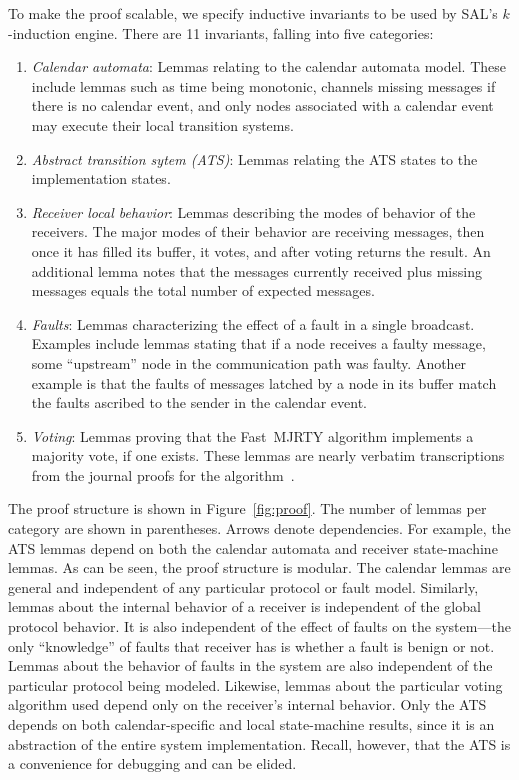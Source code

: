 \documentclass{llncs/llncs}
\begin{document}
{To make the proof scalable, we specify inductive invariants to be used by SAL's $k$-induction engine. There are 11 invariants, falling into five categories:
\begin{enumerate}
  \item \emph{Calendar automata}: Lemmas relating to the calendar automata model. These include lemmas such as time being monotonic, channels missing messages if there is no calendar event, and only nodes associated with a calendar event may execute their local transition systems.
  \item \emph{Abstract transition sytem (ATS)}: Lemmas relating the ATS states to the implementation states.
  \item \emph{Receiver local behavior}: Lemmas describing the modes of behavior of the receivers. The major modes of their behavior are receiving messages, then once it has filled its buffer, it votes, and after voting returns the result. An additional lemma notes that the messages currently received plus missing messages equals the total number of expected messages.
  \item \emph{Faults}: Lemmas characterizing the effect of a fault in a single broadcast. Examples include lemmas stating that if a node receives a faulty message, some ``upstream'' node in the communication path was faulty. Another example is that the faults of messages latched by a node in its buffer match the faults ascribed to the sender in the calendar event.
  \item \emph{Voting}: Lemmas proving that the Fast~MJRTY algorithm implements a majority vote, if one exists. These lemmas are nearly verbatim transcriptions from the journal proofs for the algorithm~\cite{mjrty}.
\end{enumerate}
\noindent
The proof structure is shown in Figure~\ref{fig:proof}. The number of lemmas per category are shown in parentheses. Arrows denote dependencies. For example, the ATS lemmas depend on both the calendar automata and receiver state-machine lemmas. As can be seen, the proof structure is modular. The calendar lemmas are general and independent of any particular protocol or fault model. Similarly, lemmas about the internal behavior of a receiver is independent of the global protocol behavior. It is also independent of the effect of faults on the system---the only ``knowledge'' of faults that receiver has is whether a fault is benign or not. Lemmas about the behavior of faults in the system are also independent of the particular protocol being modeled. Likewise, lemmas about the particular voting algorithm used depend only on the receiver's internal behavior. Only the ATS depends on both calendar-specific and local state-machine results, since it is an abstraction of the entire system implementation. Recall, however, that the ATS is a convenience for debugging and can be elided.

}
\end{document}
